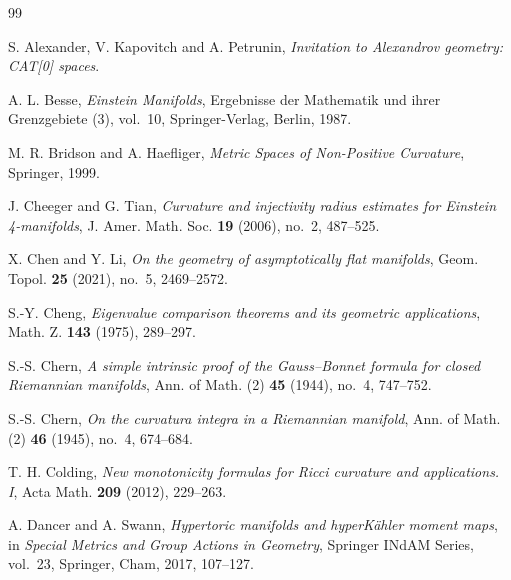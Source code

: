 \begin{thebibliography}{99}

S. Alexander, V. Kapovitch and A. Petrunin,
\emph{Invitation to Alexandrov geometry: CAT[0] spaces}.

A. L. Besse, \emph{Einstein Manifolds},
Ergebnisse der Mathematik und ihrer Grenzgebiete (3), vol.~10,
Springer-Verlag, Berlin, 1987.

M. R. Bridson and A. Haefliger,
\emph{Metric Spaces of Non-Positive Curvature}, Springer, 1999.

J. Cheeger and G. Tian,
\emph{Curvature and injectivity radius estimates for Einstein 4-manifolds},
J. Amer. Math. Soc. \textbf{19} (2006), no.~2, 487--525.

X. Chen and Y. Li, \emph{On the geometry of asymptotically flat manifolds},
Geom. Topol. \textbf{25} (2021), no.~5, 2469--2572.

S.-Y. Cheng, \emph{Eigenvalue comparison theorems and its geometric applications},
Math. Z. \textbf{143} (1975), 289--297.

S.-S. Chern, \emph{A simple intrinsic proof of the Gauss--Bonnet formula
for closed Riemannian manifolds},
Ann. of Math. (2) \textbf{45} (1944), no.~4, 747--752.

S.-S. Chern, \emph{On the curvatura integra in a Riemannian manifold},
Ann. of Math. (2) \textbf{46} (1945), no.~4, 674--684.

T. H. Colding, \emph{New monotonicity formulas for Ricci curvature and applications. I},
Acta Math. \textbf{209} (2012), 229--263.

A. Dancer and A. Swann, \emph{Hypertoric manifolds and hyperK\"ahler moment maps},
in \emph{Special Metrics and Group Actions in Geometry},
Springer INdAM Series, vol.~23, Springer, Cham, 2017, 107--127.


\end{thebibliography}
